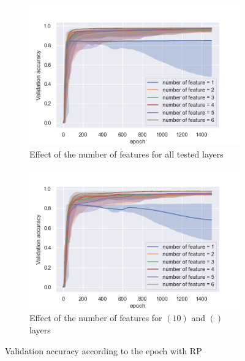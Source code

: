 \documentclass[twocolumn, 10pt]{article}
\begin{document}
			\begin{figure}[h]
				\centering
				\begin{subfigure}[t]{0.7\columnwidth}
					\centering
					\includegraphics[width=\linewidth]{../graphics/RP_epoch_val_categorical_accuracy_number_of_feature.png}
					\caption{Effect of the number of features for all tested layers}
					\label{fig:per_rnd_nf}
				\end{subfigure}
				\begin{subfigure}[t]{0.7\columnwidth}
					\centering
					\includegraphics[width=\linewidth]{../graphics/RP_epoch_val_categorical_accuracy_number_of_feature_10_.png}
					\caption{Effect of the number of features for $(10)$ and $()$ layers}
					\label{fig:per_rnd_nf_3525}
				\end{subfigure}
				\caption{Validation accuracy according to the epoch with RP}
				\label{fig:per_rnd}
			\end{figure}
\end{document}
